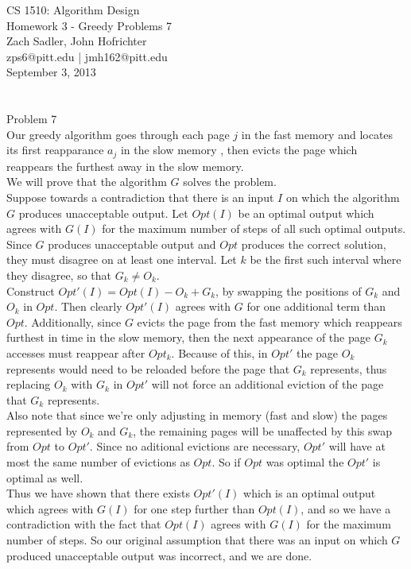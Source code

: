 \documentclass[11pt]{article}
\begin{document}
\noindent 
CS 1510: Algorithm Design\\
Homework 3 - Greedy Problems 7\\
Zach Sadler, John Hofrichter\\
zps6@pitt.edu | jmh162@pitt.edu\\
September 3, 2013\\ 
\\ 
\\

\noindent \huge 
Problem 7\\
\normalsize
\noindent 
Our greedy algorithm goes through each page $j$ in the fast memory and locates its first reapparance $a_j$ in the slow memory , then evicts the page which reappears the furthest away in the slow memory.\\
We will prove that the algorithm $G$ solves the problem.\\
Suppose towards a contradiction that there is an input $I$ on which the algorithm $G$ produces unacceptable output. Let $Opt(I)$ be an optimal output which agrees with $G(I)$ for the maximum number of steps of all such optimal outputs.\\
Since $G$ produces unacceptable output and $Opt$ produces the correct solution, they must disagree on at least one interval. Let $k$ be the first such interval where they disagree, so that $G_k \ne O_k$.\\
Construct $Opt'(I) = Opt(I) - O_k + G_k$, by swapping the positions of $G_k$ and $O_k$ in $Opt$. Then clearly $Opt'(I)$ agrees with $G$ for one additional term than $Opt$. Additionally, since $G$ evicts the page from the fast memory which reappears furthest in time in the slow memory, then the next appearance of the page $G_k$ accesses must reappear after $Opt_k$. Because of this, in $Opt'$ the page $O_k$ represents would need to be reloaded before the page that $G_k$ represents, thus replacing $O_k$ with $G_k$ in $Opt'$ will not force an additional eviction of the page that $G_k$ represents. \\
Also note that since we're only adjusting in memory (fast and slow) the pages represented by $O_k$ and $G_k$, the remaining pages will be unaffected by this swap from $Opt$ to $Opt'$. Since no aditional evictions are necessary, $Opt'$ will have at most the same number of evictions as $Opt$. So if $Opt$ was optimal the $Opt'$ is optimal as well.\\
Thus we have shown that there exists $Opt'(I)$ which is an optimal output which agrees with $G(I)$ for one step further than $Opt(I)$, and so we have a contradiction with the fact that $Opt(I)$ agrees with $G(I)$ for the maximum number of steps. So our original assumption that there was an input on which $G$ produced unacceptable output was incorrect, and we are done.\\
\\
\\
\end{document}
